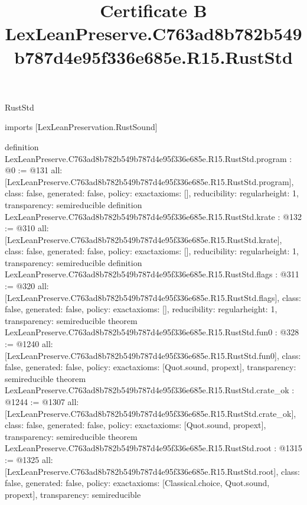 \begin{lexlean}{RustStd}
\title{Certificate B LexLeanPreserve.C763ad8b782b549b787d4e95f336e685e.R15.RustStd}
\begin{coremodule}
imports [LexLeanPreservation.RustSound]

definition LexLeanPreserve.C763ad8b782b549b787d4e95f336e685e.R15.RustStd.program : @0 := @131 {
  all: [LexLeanPreserve.C763ad8b782b549b787d4e95f336e685e.R15.RustStd.program],
  class: false,
  generated: false,
  policy: exact{axioms: []},
  reducibility: regular{height: 1},
  transparency: semireducible
}
definition LexLeanPreserve.C763ad8b782b549b787d4e95f336e685e.R15.RustStd.krate : @132 := @310 {
  all: [LexLeanPreserve.C763ad8b782b549b787d4e95f336e685e.R15.RustStd.krate],
  class: false,
  generated: false,
  policy: exact{axioms: []},
  reducibility: regular{height: 1},
  transparency: semireducible
}
definition LexLeanPreserve.C763ad8b782b549b787d4e95f336e685e.R15.RustStd.flags : @311 := @320 {
  all: [LexLeanPreserve.C763ad8b782b549b787d4e95f336e685e.R15.RustStd.flags],
  class: false,
  generated: false,
  policy: exact{axioms: []},
  reducibility: regular{height: 1},
  transparency: semireducible
}
theorem LexLeanPreserve.C763ad8b782b549b787d4e95f336e685e.R15.RustStd.fun0 : @328 := @1240 {
  all: [LexLeanPreserve.C763ad8b782b549b787d4e95f336e685e.R15.RustStd.fun0],
  class: false,
  generated: false,
  policy: exact{axioms: [Quot.sound, propext]},
  transparency: semireducible
}
theorem LexLeanPreserve.C763ad8b782b549b787d4e95f336e685e.R15.RustStd.crate_ok : @1244 := @1307 {
  all: [LexLeanPreserve.C763ad8b782b549b787d4e95f336e685e.R15.RustStd.crate_ok],
  class: false,
  generated: false,
  policy: exact{axioms: [Quot.sound, propext]},
  transparency: semireducible
}
theorem LexLeanPreserve.C763ad8b782b549b787d4e95f336e685e.R15.RustStd.root : @1315 := @1325 {
  all: [LexLeanPreserve.C763ad8b782b549b787d4e95f336e685e.R15.RustStd.root],
  class: false,
  generated: false,
  policy: exact{axioms: [Classical.choice, Quot.sound, propext]},
  transparency: semireducible
}


\end{coremodule}
\end{lexlean}
